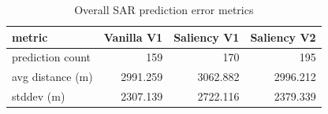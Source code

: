 \begin{table}[ht]
\centering
\caption{Overall SAR prediction error metrics}
\label{tab:sar-overall-errors}
\begin{tabular}{lrrr}
\hline
metric & Vanilla V1 & Saliency V1 & Saliency V2 \\
\hline
prediction count & 159 & 170 & 195 \\
avg distance (m) & 2991.259 & 3062.882 & 2996.212 \\
stddev (m) & 2307.139 & 2722.116 & 2379.339 \\
\hline
\end{tabular}
\end{table}
